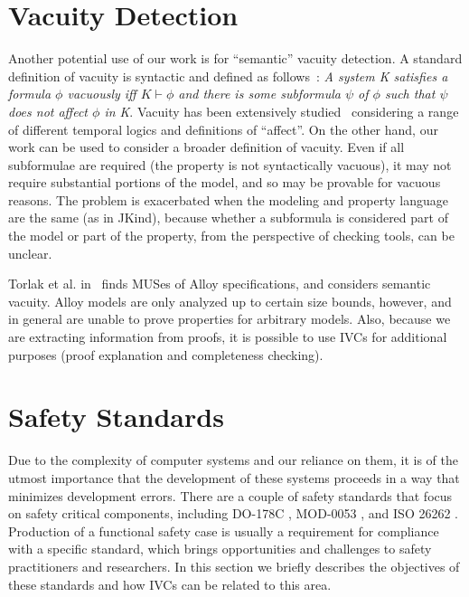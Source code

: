 \section{Vacuity Detection}
Another potential use of our work is for ``semantic'' vacuity detection.  A standard definition of vacuity is syntactic and defined as follows~\cite{Kupferman:2006:SCF}: {\em A system K satisfies a formula $\phi$ vacuously iff $K \vdash \phi$ and there is some subformula $\psi$ of $\phi$ such that $\psi$ does not affect $\phi$ in K}.  Vacuity has been extensively studied~\cite{Gurfinkel:2012:RVB,Chockler2008,DBLP:Ben-DavidK13,Kupferman:2006:SCF,Chockler:2007,Beer1997} considering a range of different temporal logics and definitions of ``affect''.  On the other hand, our work can be used to consider a broader definition of vacuity.  Even if all subformulae are required (the property is not syntactically vacuous), it may not require substantial portions of the model, and so may be provable for vacuous reasons.  The problem is exacerbated when the modeling and property language are the same (as in JKind), because whether a subformula is considered part of the model or part of the property, from the perspective of checking tools, can be unclear.

Torlak et al. in~\cite{Torlak08:cores} finds MUSes of Alloy
specifications, and considers semantic vacuity.
 Alloy models are only analyzed up to certain
size bounds, however, and in general are unable to prove properties
for arbitrary models. Also, because we are extracting information from
proofs, it is possible to use IVCs for additional purposes (proof
explanation and completeness checking).

\section{Safety Standards}
Due to the complexity of computer systems and our reliance on them, it is of the utmost importance that the development of these systems proceeds in a way that minimizes development errors. There are a couple of safety standards that focus on safety critical components, including DO-178C \cite{DO178C}, MOD-0053 \cite{standard2007standard}, and ISO 26262 \cite{iso201126262}. Production of a functional safety case is usually a requirement for compliance with a specific standard, which brings opportunities and challenges to safety practitioners and researchers. In this section we briefly describes the objectives of these standards and how IVCs can be related to this area.

